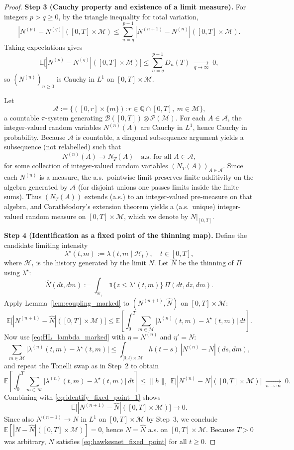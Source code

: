\documentclass[12pt]{article}
\begin{document}
\begin{proof}
\textbf{Step 3 (Cauchy property and existence of a limit measure).}
For integers $p>q\ge 0$, by the triangle inequality for total variation,
\[
|N^{(p)}-N^{(q)}|([0,T]\times\mathcal M)
\le
\sum_{n=q}^{p-1}|N^{(n+1)}-N^{(n)}|([0,T]\times\mathcal M).
\]
Taking expectations gives
\[
\mathbb E\bigl[|N^{(p)}-N^{(q)}|([0,T]\times\mathcal M)\bigr]
\le
\sum_{n=q}^{p-1}D_n(T)
\;\xrightarrow[q\to\infty]{}\;0,
\]
so $(N^{(n)})_{n\ge 0}$ is Cauchy in $L^1$ on $[0,T]\times\mathcal M$.

Let
\[
\mathcal A
:=
\bigl\{([0,r]\times\{m\}) : r\in\mathbb Q\cap[0,T],\ m\in\mathcal M \bigr\},
\]
a countable $\pi$-system generating $\mathcal B([0,T])\otimes\mathcal P(\mathcal M)$.
For each $A\in\mathcal A$, the integer-valued random variables $N^{(n)}(A)$ are Cauchy in $L^1$, hence Cauchy in probability.
Because $\mathcal A$ is countable, a diagonal subsequence argument yields a subsequence (not relabelled) such that
\[
N^{(n)}(A)\to N_T(A)\quad\text{a.s. for all }A\in\mathcal A,
\]
for some collection of integer-valued random variables $(N_T(A))_{A\in\mathcal A}$.
Since each $N^{(n)}$ is a measure, the a.s.\ pointwise limit preserves finite additivity on the algebra generated by $\mathcal A$
(for disjoint unions one passes limits inside the finite sums).
Thus $(N_T(A))$ extends (a.s.) to an integer-valued pre-measure on that algebra, and Carath\'eodory's extension theorem yields
a (a.s.\ unique) integer-valued random measure on $[0,T]\times\mathcal M$, which we denote by $N|_{[0,T]}$.

\textbf{Step 4 (Identification as a fixed point of the thinning map).}
Define the candidate limiting intensity
\[
\lambda^\star(t,m) := \lambda(t,m\mid \mathcal H_t),
\quad t\in[0,T],
\]
where $\mathcal H_t$ is the history generated by the limit $N$.
Let $\widehat N$ be the thinning of $\Pi$ using $\lambda^\star$:
\[
\widehat N(dt,dm)
:=
\int_{\mathbb R_+}\mathbf 1\{z\le \lambda^\star(t,m)\}\,\Pi(dt,dz,dm).
\]
Apply Lemma~\ref{lem:coupling_marked} to $(N^{(n+1)},\widehat N)$ on $[0,T]\times\mathcal M$:
\begin{equation}
\label{eq:identify_fixed_point_1}
\mathbb E\bigl[|N^{(n+1)}-\widehat N|([0,T]\times\mathcal M)\bigr]
\le
\mathbb E\!\left[\int_0^T\sum_{m\in\mathcal M}\bigl|\lambda^{(n)}(t,m)-\lambda^\star(t,m)\bigr|\,dt\right].
\end{equation}
Now use \eqref{eq:HL_lambda_marked} with $\eta=N^{(n)}$ and $\eta'=N$:
\[
\sum_{m\in\mathcal M}\bigl|\lambda^{(n)}(t,m)-\lambda^\star(t,m)\bigr|
\le
\int_{[0,t)\times\mathcal M} h(t-s)\,|N^{(n)}-N|(ds,dm),
\]
and repeat the Tonelli swap as in Step~2 to obtain
\[
\mathbb E\!\left[\int_0^T\sum_{m\in\mathcal M}\bigl|\lambda^{(n)}(t,m)-\lambda^\star(t,m)\bigr|\,dt\right]
\le
\|h\|_1\,
\mathbb E\bigl[|N^{(n)}-N|([0,T]\times\mathcal M)\bigr]
\;\xrightarrow[n\to\infty]{}\;0.
\]
Combining with \eqref{eq:identify_fixed_point_1} shows
\[
\mathbb E\bigl[|N^{(n+1)}-\widehat N|([0,T]\times\mathcal M)\bigr]\to 0.
\]
Since also $N^{(n+1)}\to N$ in $L^1$ on $[0,T]\times\mathcal M$ by Step~3, we conclude
$\mathbb E[|N-\widehat N|([0,T]\times\mathcal M)]=0$, hence $N=\widehat N$ a.s. on $[0,T]\times\mathcal M$.
Because $T>0$ was arbitrary, $N$ satisfies \eqref{eq:hawkesnet_fixed_point} for all $t\ge 0$.


\end{proof}
\end{document}
